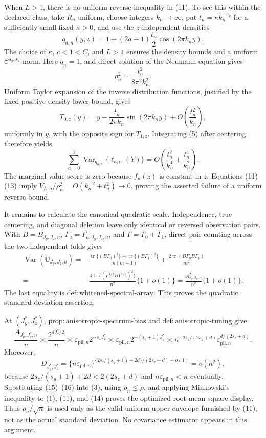 When \(L>1\), there is no uniform reverse inequality in (11).  To see this within the declared class, take \(R_n\) uniform, choose integers \(k_n\to\infty\), put \(t_n=\kappa k_n^{-s_y}\) for a sufficiently small fixed \(\kappa>0\), and use the \(z\)-independent densities
\[
q_{a,n}(y,z)=1+(2a-1)\frac{t_n}{2}\cos(2\pi k_ny).
\]
The choice of \(\kappa\), \(c<1<C\), and \(L>1\) ensures the density bounds and a uniform \(\mathcal C^{s_y,s_z}\) norm.  Here \(\bar q_n=1\), and direct solution of the Neumann equation gives
\[
\rho_n^2=\frac{t_n^2}{8\pi^2k_n^2}.                                             \tag{12}
\]
Uniform Taylor expansion of the inverse distribution functions, justified by the fixed positive density lower bound, gives
\[
T_{0,z}(y)=y-\frac{t_n}{2\pi k_n}\sin(2\pi k_ny)
+O\!\left(\frac{t_n^2}{k_n}\right),
\]
uniformly in \(y\), with the opposite sign for \(T_{1,z}\).  Integrating (5) after centering therefore yields
\[
\sum_{a=0}^1\operatorname{Var}_{q_{a,n}}\{\ell_{a,n}(Y)\}
=O\!\left(\frac{t_n^2}{k_n^4}+\frac{t_n^4}{k_n^2}\right).                      \tag{13}
\]
The marginal value score is zero because \(f_n(z)\) is constant in \(z\).  Equations (11)--(13) imply \(V_{L,n}/\rho_n^2=O(k_n^{-2}+t_n^2)\to0\), proving the asserted failure of a uniform reverse bound.

It remains to calculate the canonical quadratic scale.  Independence, true centering, and diagonal deletion leave only identical or reversed observation pairs.  With \(B=B_{J_y,J_z,n}\), \(\Gamma_a=\Gamma_{a,J_y,J_z,n}\), and \(\Gamma=\Gamma_0+\Gamma_1\), direct pair counting across the two independent folds gives
\[
\begin{split}
\operatorname{Var}(\mathbb U_{J_y,J_z,n})
={}&\frac{\operatorname{tr}\{(B\Gamma_0)^2\}+\operatorname{tr}\{(B\Gamma_1)^2\}}{m(m-1)}
+\frac{2\operatorname{tr}(B\Gamma_0B\Gamma_1)}{m^2}\\
={}&\frac{4\operatorname{tr}\{(\Gamma^{1/2}B\Gamma^{1/2})^2\}}{n^2}\{1+o(1)\}
=\frac{A_{J_y,J_z,n}^2}{n^2}\{1+o(1)\}.                                      \tag{14}
\end{split}
\]
The last equality is \(\mathrm{def{:}whitened\text{-}spectral\text{-}array}\).  This proves the quadratic standard-deviation assertion.

At \((J_y^*,J_z^*)\), \(\mathrm{prop{:}anisotropic\text{-}spectrum\text{-}bias}\) and \(\mathrm{def{:}anisotropic\text{-}tuning}\) give
\[
\frac{A_{J_y^*,J_z^*,n}}n
\asymp\frac{2^{dJ_z^*/2}}n
\asymp\varepsilon_{\mathrm{pil},n}2^{-s_zJ_z^*}
\asymp\varepsilon_{\mathrm{pil},n}2^{-(s_y+1)J_y^*}
\asymp n^{-2s_z/(2s_z+d)}
\varepsilon_{\mathrm{pil},n}^{d/(2s_z+d)}.                                    \tag{15}
\]
Moreover,
\[
D_{J_y^*,J_z^*}
=\{n\varepsilon_{\mathrm{pil},n}\}^{\{2s_z/(s_y+1)+2d\}/(2s_z+d)+o(1)}
=o(n^2),                                                                        \tag{16}
\]
because \(2s_z/(s_y+1)+2d<2(2s_z+d)\) and \(n\varepsilon_{\mathrm{pil},n}<n\) eventually.  Substituting (15)--(16) into (3), using \(\rho_n\le\rho\), and applying Minkowski's inequality to (1), (11), and (14) proves the optimized root-mean-square display.  Thus \(\rho_n/\sqrt n\) is used only as the valid uniform upper envelope furnished by (11), not as the actual standard deviation.  No covariance estimator appears in this argument.
